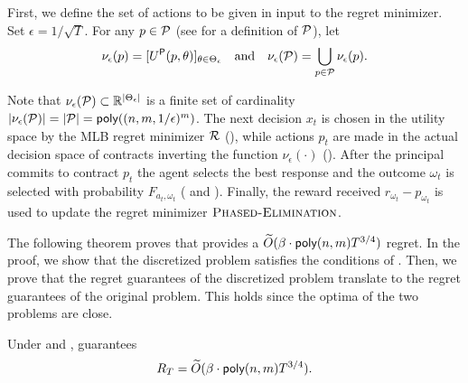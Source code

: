 First, we define the set of actions to be given in input to the regret minimizer. Set $\epsilon=1/\sqrt{T}$.
For any $p \in \mathcal{P}$ (see  for a definition of $\mathcal{P}$), let 
\[
\nu_\epsilon(p)=[U^\textsf{P}(p,\theta)]_{\theta \in \Theta_\epsilon}\quad\text{and}\quad\nu_\epsilon(\mathcal{P})= \bigcup_{p \in \mathcal{P}} \nu_\epsilon(p).
\]

Note that $\nu_\epsilon(\mathcal{P})\subset \mathbb{R}^{|\Theta_\epsilon|}$ is a finite set of cardinality $|\nu_\epsilon(\mathcal{P})|=|\mathcal{P}|=\textsf{poly}((n,m,1/\epsilon)^m)$.
%
The next decision $x_t$ is chosen in the utility space by the MLB regret minimizer $\mathcal{R}$ (), while actions $p_t$ are made in the actual decision space of contracts inverting the function $\nu_\epsilon(\cdot)$ (). After the principal commits to contract $p_t$ the agent selects the best response and the outcome $\omega_t$ is selected with probability $F_{a_t,\omega_t}$ ( and ). Finally, the reward received $r_{\omega_t}-p_{\omega_t}$ is used to update the regret minimizer $\textsc{Phased-Elimination}$.

The following theorem proves that  provides a $\widetilde O(\beta \cdot\textsf{poly}(n,m)T^{3/4})$ regret.
%
In the proof, we show that the discretized problem satisfies the conditions of . Then, we prove that the regret guarantees of the discretized problem translate to the regret guarantees of the original problem. This holds since the optima of the two problems are close. 

\begin{theorem}\label{thm:regret}
	Under  and ,  guarantees
	 \[R_T=\widetilde O(\beta \cdot\textsf{poly}(n,m)T^{3/4}).\]
\end{theorem}

